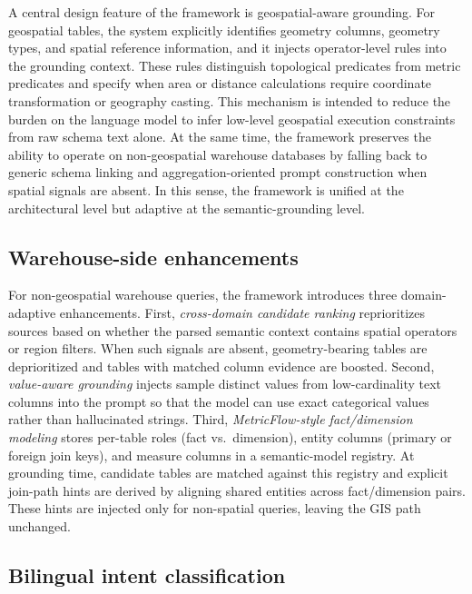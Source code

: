 \documentclass[11pt]{article}
\begin{document}
A central design feature of the framework is geospatial-aware grounding. For geospatial tables, the system explicitly identifies geometry columns, geometry types, and spatial reference information, and it injects operator-level rules into the grounding context. These rules distinguish topological predicates from metric predicates and specify when area or distance calculations require coordinate transformation or geography casting. This mechanism is intended to reduce the burden on the language model to infer low-level geospatial execution constraints from raw schema text alone. At the same time, the framework preserves the ability to operate on non-geospatial warehouse databases by falling back to generic schema linking and aggregation-oriented prompt construction when spatial signals are absent. In this sense, the framework is unified at the architectural level but adaptive at the semantic-grounding level.

\subsection{Warehouse-side enhancements}

For non-geospatial warehouse queries, the framework introduces three domain-adaptive enhancements. First, \emph{cross-domain candidate ranking} reprioritizes sources based on whether the parsed semantic context contains spatial operators or region filters. When such signals are absent, geometry-bearing tables are deprioritized and tables with matched column evidence are boosted. Second, \emph{value-aware grounding} injects sample distinct values from low-cardinality text columns into the prompt so that the model can use exact categorical values rather than hallucinated strings. Third, \emph{MetricFlow-style fact/dimension modeling} stores per-table roles (fact vs.\ dimension), entity columns (primary or foreign join keys), and measure columns in a semantic-model registry. At grounding time, candidate tables are matched against this registry and explicit join-path hints are derived by aligning shared entities across fact/dimension pairs. These hints are injected only for non-spatial queries, leaving the GIS path unchanged.

\subsection{Bilingual intent classification}
\end{document}
